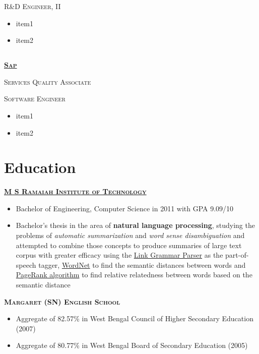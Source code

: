 \documentclass{article}
\begin{document}
{\raggedright{\textsc{R\&D Engineer, II}}} \hfill {}

\begin{itemize}[noitemsep,nolistsep]
	\item item1
	\item item2
\end{itemize}

\subsection[Sap]{}
{\raggedright{\textsc{\textbf{\href{https://www.sap.com/index.html}{Sap}}}}} \hfill {}

{\raggedright{\textsc{Services Quality Associate}}} \hfill {}

{\raggedright{\textsc{Software Engineer}}} \hfill {}

\begin{itemize}[noitemsep,nolistsep]
	\item item1
	\item item2
\end{itemize}

\section{Education}
{\raggedright{\textsc{\textbf{\href{http://www.msrit.edu}{M S Ramaiah Institute of Technology}}}}} \hfill {}

\begin{itemize}[noitemsep,nolistsep]
	\item Bachelor of Engineering, Computer Science in 2011 with GPA 9.09/10
	\item Bachelor’s thesis in the area of \textbf{natural language processing}, studying the problems of \textit{automatic summarization} and \textit{word sense disambiguation} and attempted to combine those concepts to produce summaries of large text corpus with greater efficacy using the \href{https://www.link.cs.cmu.edu/link/}{Link Grammar Parser} as the part-of-speech tagger, \href{https://wordnet.princeton.edu/}{WordNet} to find the semantic distances between words and \href{https://en.wikipedia.org/wiki/PageRank}{PageRank algorithm} to find relative relatedness between words based on the semantic distance
\end{itemize}


{\raggedright{\textsc{\textbf{Margaret (SN) English School}}}} \hfill {}
\begin{itemize}[noitemsep,nolistsep]
	\item Aggregate of 82.57\% in West Bengal Council of Higher Secondary Education (2007)
	\item Aggregate of 80.77\% in West Bengal Board of Secondary Education (2005)
\end{itemize}
\end{document}
